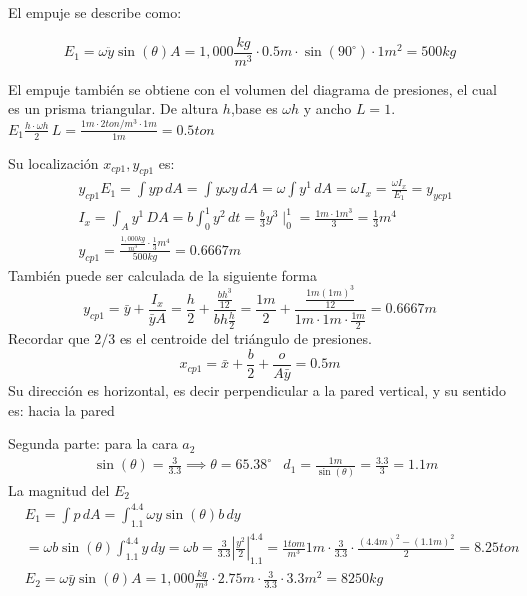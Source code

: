 El empuje se describe como: 

\begin{equation*}
    E_1=\omega\ddot{y}\sin{(\theta)}A=1,000\frac{kg}{m^3}\cdot 0.5m\cdot \sin{(90^{\circ})}\cdot 1m^2=500kg
\end{equation*}

El empuje también se obtiene con el volumen del diagrama de presiones, el cual es un prisma triangular. De altura $h$,base es $\omega h$ y ancho $L=1$. $E_1\frac{h\cdot\omega h}{2}\, L=\frac{1m\cdot 2 ton/m^3\cdot 1m}{1m}=0.5ton$

Su localización $x_{cp1},y_{cp1}$ es:
\begin{align*}
    &y_{cp1}E_1=\int yp\,dA=\int y\omega y\, dA=\omega\int y^1\, dA=\omega I_x=\frac{\omega I_x}{E_1}=y_{ycp1}\\
    &I_x=\int_A y^1\, DA=b\int_0^1 y^2\, dt=\frac{b}{3}y^3\mid_0^1=\frac{1m\cdot 1m^3}{3}=\frac{1}{3}m^4\\
    &y_{cp1}=\frac{\frac{1,000kg}{m^3}\cdot \frac{1}{3}m^4}{500kg}=0.6667m
\end{align*}
También puede ser calculada de la siguiente forma
\begin{equation*}
    y_{cp1}=\bar{y}+\frac{I_x}{\bar{y}A}=\frac{h}{2}+\frac{\frac{bh^3}{12}}{bh\frac{h}{2}}=\frac{1m}{2}+\frac{\frac{1m(1m)^3}{12}}{1m\cdot 1m\cdot \frac{1m}{2}}=0.6667m
\end{equation*}
Recordar que $2/3$ es el centroide del triángulo de presiones.
\begin{equation*}
    x_{cp1}=\bar{x}+\frac{b}{2}+\frac{o}{A\bar{y}}=0.5m
\end{equation*}
Su dirección es horizontal, es decir perpendicular a la pared vertical, y su sentido es: hacia la pared

Segunda parte: para la cara $a_2$
\begin{align*}
    &\sin{(\theta)}=\frac{3}{3.3}\implies \theta=65.38^{\circ}
    &d_1=\frac{1m}{\sin{(\theta)}}=\frac{3.3}{3}=1.1m
\end{align*}
La magnitud del $E_2$
\begin{align*}
    &E_1=\int p\, dA=\int_{1.1}^{4.4}\omega y\sin{(\theta)}b\, dy\\
    &=\omega b\sin{(\theta)}\int_{1.1}^{4.4}y\,dy=\omega b=\frac{3}{3.3}\left\lvert \frac{y^2}{2}\right\rvert_{1.1}^{4.4}=\frac{1tom}{m^3}1m\cdot \frac{3}{3.3}\cdot\frac{(4.4m)^2-(1.1m)^2}{2}=8.25ton\\
    &E_2=\omega\bar{y}\sin{(\theta)}A=1,000\frac{kg}{m^3}\cdot 2.75m\cdot \frac{3}{3.3}\cdot 3.3m^2=8250kg
\end{align*}

